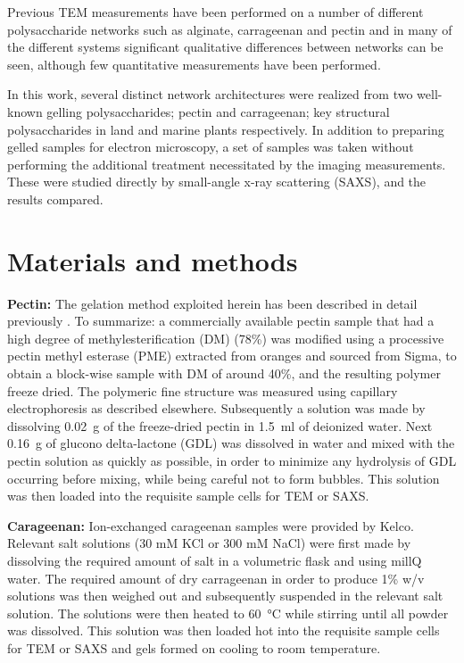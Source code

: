 Previous TEM measurements have been performed on a number of different polysaccharide networks such as alginate, carrageenan and pectin\cite{lundin_rheology_1997, brun_texture_2011, domozych_pectin_2014} and in many of the different systems significant qualitative differences between networks can be seen, although few quantitative measurements have been performed.

In this work, several distinct network architectures were realized from two well-known gelling polysaccharides; pectin and carrageenan; key structural polysaccharides in land and marine plants respectively. In addition to preparing gelled samples for electron microscopy, a set of samples was taken without performing the additional treatment necessitated by the imaging measurements. These were studied directly by small-angle x-ray scattering (SAXS), and the results compared.


\section{Materials and methods}
\textbf{Pectin: }The gelation method exploited herein has been described in detail previously \cite{mansel_zooming_2015}. To summarize: a commercially available pectin sample that had a high degree of methylesterification (DM) (78\%) was modified using a processive pectin methyl esterase (PME) extracted from oranges and sourced from Sigma, to obtain a block-wise sample with DM of around 40\%, and the resulting polymer freeze dried. The polymeric fine structure was measured using capillary electrophoresis as described elsewhere. Subsequently a solution was made by dissolving \SI{0.02}{\g} of the freeze-dried pectin in \SI{1.5}{\ml} of deionized water. Next \SI{0.16}{\g} of glucono delta-lactone (GDL) was dissolved in water and mixed with the pectin solution as quickly as possible, in order to minimize any hydrolysis of GDL occurring before mixing, while being careful not to form bubbles. This solution was then loaded into the requisite sample cells for TEM or SAXS.

\textbf{Carageenan: }Ion-exchanged carageenan samples were provided by Kelco. Relevant salt solutions (30 mM KCl  or 300 mM NaCl) were first made by dissolving the required amount of salt in a volumetric flask and using millQ water. The required amount of dry carrageenan in order to produce 1\% w/v solutions was then weighed out and subsequently suspended in the relevant salt solution. The solutions were then heated to \SI{60}{\degreeCelsius} while stirring until all powder was dissolved. This solution was then loaded hot into the requisite sample cells for TEM or SAXS and gels formed on cooling to room temperature.

